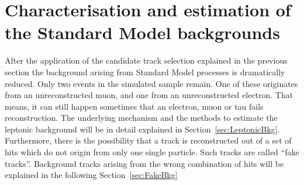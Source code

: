 \chapter{Characterisation and estimation of the Standard Model backgrounds}
\label{sec:BackgroundEstimation}
After the application of the candidate track selection explained in the previous section the background arising from Standard Model processes is dramatically reduced.
Only two events in the simulated \WJets sample remain.
One of these originates from an unreconstructed muon, and one from an unreconstructed electron.
That means, it can still happen sometimes that an electron, muon or tau fails reconstruction.
The underlying mechanism and the methods to estimate the leptonic background will be in detail explained in Section~\ref{sec:LeptonicBkg}.
Furthermore, there is the possibility that a track is reconstructed out of a set of hits which do not origin from only one single particle.
Such tracks are called ``fake tracks''. 
Background tracks arising from the wrong combination of hits will be explained in the following Section~\ref{sec:FakeBkg}

